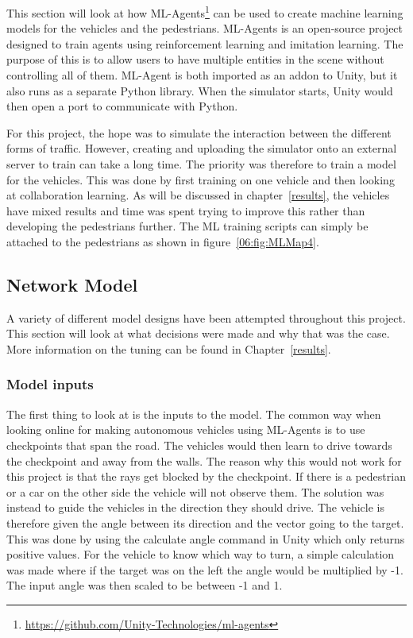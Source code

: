 This section will look at how ML-Agents\footnote{\url{https://github.com/Unity-Technologies/ml-agents}} can be used to create machine learning models for the vehicles and the pedestrians. ML-Agents is an open-source project designed to train agents using reinforcement learning and imitation learning. The purpose of this is to allow users to have multiple entities in the scene without controlling all of them. ML-Agent is both imported as an addon to Unity, but it also runs as a separate Python library. When the simulator starts, Unity would then open a port to communicate with Python. 

For this project, the hope was to simulate the interaction between the different forms of traffic. However, creating and uploading the simulator onto an external server to train can take a long time. The priority was therefore to train a model for the vehicles. This was done by first training on one vehicle and then looking at collaboration learning.  As will be discussed in chapter~\ref{results}, the vehicles have mixed results and time was spent trying to improve this rather than developing the pedestrians further. The ML training scripts can simply be attached to the pedestrians as shown in figure~\ref{06:fig:MLMap4}.  

\subsection{Network Model}
A variety of different model designs have been attempted throughout this project. This section will look at what decisions were made and why that was the case. More information on the tuning can be found in Chapter~\ref{results}.

\subsubsection{Model inputs}
The first thing to look at is the inputs to the model. The common way when looking online for making autonomous vehicles using ML-Agents is to use checkpoints that span the road. The vehicles would then learn to drive towards the checkpoint and away from the walls. The reason why this would not work for this project is that the rays get blocked by the checkpoint. If there is a pedestrian or a car on the other side the vehicle will not observe them. The solution was instead to guide the vehicles in the direction they should drive. The vehicle is therefore given the angle between its direction and the vector going to the target. This was done by using the calculate angle command in Unity which only returns positive values. For the vehicle to know which way to turn, a simple calculation was made where if the target was on the left the angle would be multiplied by -1. The input angle was then scaled to be between -1 and 1. 

